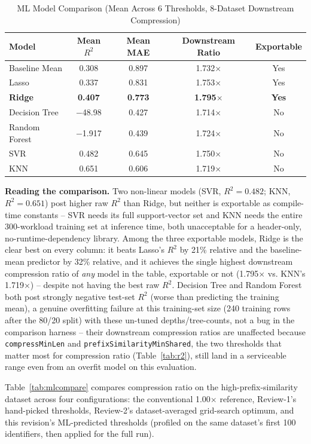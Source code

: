 \documentclass[conference]{IEEEtran}
\begin{document}
\begin{table}[htbp]
\caption{ML Model Comparison (Mean Across 6 Thresholds, 8-Dataset Downstream Compression)}
\label{tab:modelcompare}
\centering
\small
\begin{tabular}{lcccc}
\toprule
Model & Mean $R^2$ & Mean MAE & Downstream Ratio & Exportable \\
\midrule
Baseline Mean & 0.308 & 0.897 & 1.732$\times$ & Yes \\
Lasso & 0.337 & 0.831 & 1.753$\times$ & Yes \\
\textbf{Ridge} & \textbf{0.407} & \textbf{0.773} & \textbf{1.795$\times$} & \textbf{Yes} \\
Decision Tree & $-$48.98 & 0.427 & 1.714$\times$ & No \\
Random Forest & $-$1.917 & 0.439 & 1.724$\times$ & No \\
SVR & 0.482 & 0.645 & 1.750$\times$ & No \\
KNN & 0.651 & 0.606 & 1.719$\times$ & No \\
\bottomrule
\end{tabular}
\end{table}

\textbf{Reading the comparison.} Two non-linear models (SVR, $R^2=0.482$;
KNN, $R^2=0.651$) post higher raw $R^2$ than Ridge, but neither is
exportable as compile-time constants -- SVR needs its full support-vector
set and KNN needs the entire 300-workload training set at inference time,
both unacceptable for a header-only, no-runtime-dependency library. Among
the three exportable models, Ridge is the clear best on every column: it
beats Lasso's $R^2$ by 21\% relative and the baseline-mean predictor by
32\% relative, and it achieves the single highest downstream compression
ratio of \emph{any} model in the table, exportable or not (1.795$\times$
vs. KNN's 1.719$\times$) -- despite not having the best raw $R^2$. Decision
Tree and Random Forest both post strongly negative test-set $R^2$ (worse
than predicting the training mean), a genuine overfitting failure at this
training-set size (240 training rows after the 80/20 split) with these
un-tuned depths/tree-counts, not a bug in the comparison harness -- their
downstream compression ratios are unaffected because \texttt{compressMinLen}
and \texttt{prefixSimilarityMinShared}, the two thresholds that matter most
for compression ratio (Table~\ref{tab:r2}), still land in a serviceable
range even from an overfit model on this evaluation.

Table~\ref{tab:mlcompare} compares compression ratio on the
high-prefix-similarity dataset across four configurations: the conventional
1.00$\times$ reference, Review-1's hand-picked thresholds, Review-2's
dataset-averaged grid-search optimum, and this revision's ML-predicted
thresholds (profiled on the same dataset's first 100 identifiers, then
applied for the full run).
\end{document}
